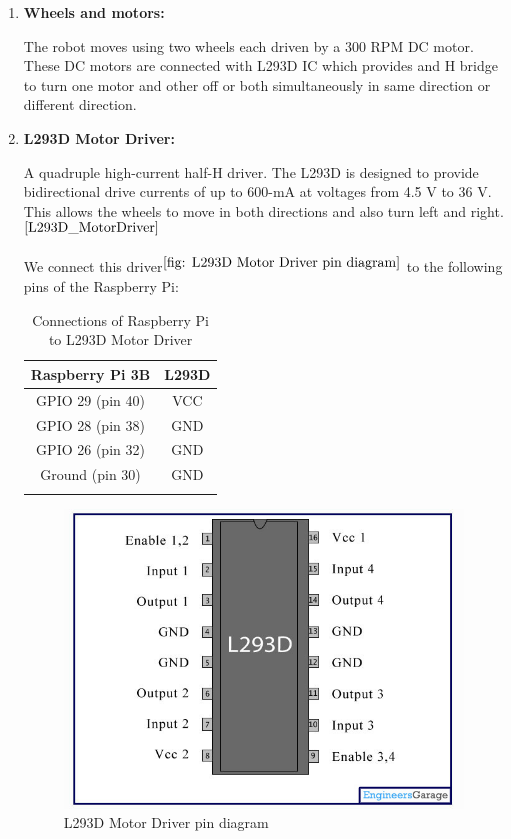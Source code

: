 \begin{enumerate}[topsep=-2pt, itemsep=10mm]
			
		
		
		
			
		\clearpage
		
		\item \textbf{Wheels and motors:} 
		
			The robot moves using two wheels each driven by a 300 RPM DC motor. These DC motors are connected with L293D IC which provides and H bridge to turn one motor and other off or both simultaneously in same direction or different direction. 
		
		
		\item \textbf{L293D Motor Driver:} 
		
			A quadruple high-current half-H driver. The L293D is designed to provide bidirectional drive currents of up to 600-mA at voltages from 4.5 V to 36 V. This allows the wheels to move in both directions and also turn left and right. ${}^{\cite{L293D_MotorDriver}}$
		
		
			We connect this driver${}^{\ref{fig: L293D Motor Driver pin diagram}}$ to the following pins of the Raspberry Pi:
	
			\tabulinesep=6pt	%
			\begin{longtabu} to \textwidth {| c | c | } \hline
				\centering 
				Raspberry Pi 3B & L293D \\ \hline
				GPIO 29 (pin 40) & VCC \\ 
				GPIO 28 (pin 38) & GND \\ 
				GPIO 26 (pin 32) & GND \\ 
				Ground (pin 30) & GND \\ \hline
				\caption{Connections of Raspberry Pi to L293D Motor Driver}
			\end{longtabu}
			
			\begin{figure}[!h]
				\centering
				\includegraphics[width=0.5\linewidth]{"./L293D.jpg"}
				\caption{L293D Motor Driver pin diagram}
				\label{fig: L293D Motor Driver pin diagram}
			\end{figure}
			

\end{enumerate}

